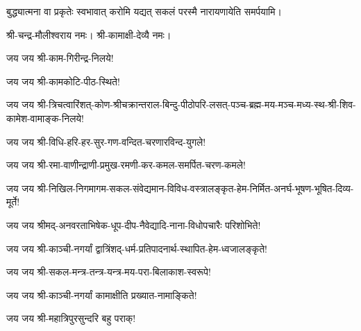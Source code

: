 {बुद्ध्यात्मना वा प्रकृतेः स्वभावात्}
{करोमि यद्यत् सकलं परस्मै}
{नारायणायेति समर्पयामि।}

\closesub


श्री-चन्द्र-मौलीश्वराय नमः। श्री-कामाक्षी-देव्यै नमः।

जय जय श्री-काम-गिरीन्द्र-निलये!

जय जय श्री-कामकोटि-पीठ-स्थिते!

जय जय श्री-त्रिचत्वारिंशत्-कोण-श्रीचक्रान्तराल-बिन्दु-पीठोपरि-लसत्-पञ्च-ब्रह्म-मय-मञ्च-मध्य-स्थ-श्री-शिव-कामेश-वामाङ्क-निलये!

जय जय श्री-विधि-हरि-हर-सुर-गण-वन्दित-चरणारविन्द-युगले!

जय जय श्री-रमा-वाणीन्द्राणी-प्रमुख-रमणी-कर-कमल-समर्पित-चरण-कमले!

जय जय श्री-निखिल-निगमागम-सकल-संवेद्यमान-विविध-वस्त्रालङ्कृत-हेम-निर्मित-अनर्घ-भूषण-भूषित-दिव्य-मूर्ते!

जय जय श्रीमद्-अनवरताभिषेक-धूप-दीप-नैवेद्यादि-नाना-विधोपचारैः परिशोभिते!

जय जय श्री-काञ्ची-नगर्यां द्वात्रिंशद्-धर्म-प्रतिपादनार्थ-स्थापित-हेम-ध्वजालङ्कृते!

जय जय श्री-सकल-मन्त्र-तन्त्र-यन्त्र-मय-परा-बिलाकाश-स्वरूपे!

जय जय श्री-काञ्ची-नगर्यां कामाक्षीति प्रख्यात-नामाङ्किते!

जय जय श्री-महात्रिपुरसुन्दरि बहु पराक्!

\kshama

\closesub

\begingroup
{}
\endgroup

\closesection
